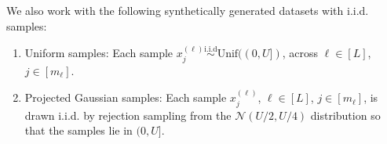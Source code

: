 We also work with the following synthetically generated datasets with i.i.d. samples:
\begin{enumerate}
	\item Uniform samples: Each sample $x_j^{(\ell)}\stackrel{\text{i.i.d}}{\sim} \text{Unif}((0,U])$, across $\ell\in [L]$, $j\in [m_\ell]$. 
	\item Projected Gaussian samples: Each sample $x_j^{(\ell)}$, $\ell\in [L]$, $j\in [m_\ell]$, is drawn i.i.d. by rejection sampling from the $\mathcal{N}(U/2,U/4)$ distribution so that the samples lie in $(0,U]$. 
\end{enumerate}
